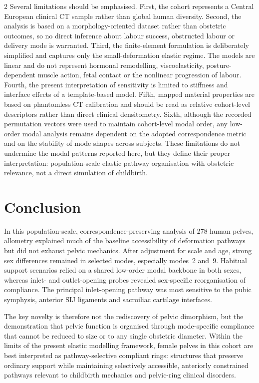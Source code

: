 \documentclass[openacc]{rsproca_new}
\begin{document}
\begin{multicols}{2}
Several limitations should be emphasised. First, the cohort represents a Central European clinical CT sample rather than global human diversity. Second, the analysis is based on a morphology-oriented dataset rather than obstetric outcomes, so no direct inference about labour success, obstructed labour or delivery mode is warranted. Third, the finite-element formulation is deliberately simplified and captures only the small-deformation elastic regime. The models are linear and do not represent hormonal remodelling, viscoelasticity, posture-dependent muscle action, fetal contact or the nonlinear progression of labour. Fourth, the present interpretation of sensitivity is limited to stiffness and interface effects of a template-based model. Fifth, mapped material properties are based on phantomless CT calibration and should be read as relative cohort-level descriptors rather than direct clinical densitometry. Sixth, although the recorded permutation vectors were used to maintain cohort-level modal order, any low-order modal analysis remains dependent on the adopted correspondence metric and on the stability of mode shapes across subjects. These limitations do not undermine the modal patterns reported here, but they define their proper interpretation: population-scale elastic pathway organisation with obstetric relevance, not a direct simulation of childbirth.

\section{Conclusion}

In this population-scale, correspondence-preserving analysis of 278 human pelves, allometry explained much of the baseline accessibility of deformation pathways but did not exhaust pelvic mechanics. After adjustment for scale and age, strong sex differences remained in selected modes, especially modes~2 and~9. Habitual support scenarios relied on a shared low-order modal backbone in both sexes, whereas inlet- and outlet-opening probes revealed sex-specific reorganisation of compliance. The principal inlet-opening pathway was most sensitive to the pubic symphysis, anterior SIJ ligaments and sacroiliac cartilage interfaces.

The key novelty is therefore not the rediscovery of pelvic dimorphism, but the demonstration that pelvic function is organised through mode-specific compliance that cannot be reduced to size or to any single obstetric diameter. Within the limits of the present elastic modelling framework, female pelves in this cohort are best interpreted as pathway-selective compliant rings: structures that preserve ordinary support while maintaining selectively accessible, anteriorly constrained pathways relevant to childbirth mechanics and pelvic-ring clinical disorders.


\end{multicols}
\end{document}

